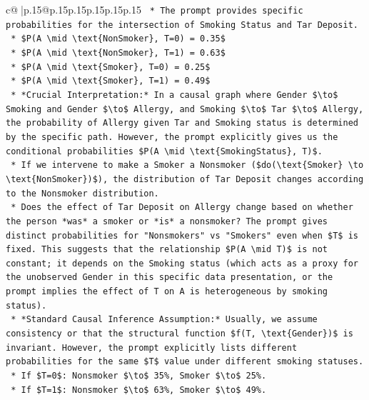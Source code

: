 \documentclass{article}
\begin{document}
{\begin{supertabular}{c@{$\;$}|p{.15\linewidth}@{}p{.15\linewidth}p{.15\linewidth}p{.15\linewidth}p{.15\linewidth}p{.15\linewidth}}
{{{\texttt{    *   The prompt provides specific probabilities for the intersection of Smoking Status and Tar Deposit.} \\
\texttt{        *   \$P(A \textbackslash{}mid \textbackslash{}text\{NonSmoker\}, T=0) = 0.35\$} \\
\texttt{        *   \$P(A \textbackslash{}mid \textbackslash{}text\{NonSmoker\}, T=1) = 0.63\$} \\
\texttt{        *   \$P(A \textbackslash{}mid \textbackslash{}text\{Smoker\}, T=0) = 0.25\$} \\
\texttt{        *   \$P(A \textbackslash{}mid \textbackslash{}text\{Smoker\}, T=1) = 0.49\$} \\
\texttt{    *   *Crucial Interpretation:* In a causal graph where Gender \$\textbackslash{}to\$ Smoking and Gender \$\textbackslash{}to\$ Allergy, and Smoking \$\textbackslash{}to\$ Tar \$\textbackslash{}to\$ Allergy, the probability of Allergy given Tar and Smoking status is determined by the specific path. However, the prompt explicitly gives us the conditional probabilities \$P(A \textbackslash{}mid \textbackslash{}text\{SmokingStatus\}, T)\$.} \\
\texttt{    *   If we intervene to make a Smoker a Nonsmoker (\$do(\textbackslash{}text\{Smoker\} \textbackslash{}to \textbackslash{}text\{NonSmoker\})\$), the distribution of Tar Deposit changes according to the Nonsmoker distribution.} \\
\texttt{    *   Does the effect of Tar Deposit on Allergy change based on whether the person *was* a smoker or *is* a nonsmoker? The prompt gives distinct probabilities for "Nonsmokers" vs "Smokers" even when \$T\$ is fixed. This suggests that the relationship \$P(A \textbackslash{}mid T)\$ is not constant; it depends on the Smoking status (which acts as a proxy for the unobserved Gender in this specific data presentation, or the prompt implies the effect of T on A is heterogeneous by smoking status).} \\
\texttt{    *   *Standard Causal Inference Assumption:* Usually, we assume consistency or that the structural function \$f(T, \textbackslash{}text\{Gender\})\$ is invariant. However, the prompt explicitly lists different probabilities for the same \$T\$ value under different smoking statuses.} \\
\texttt{        *   If \$T=0\$: Nonsmoker \$\textbackslash{}to\$ 35\%, Smoker \$\textbackslash{}to\$ 25\%.} \\
\texttt{        *   If \$T=1\$: Nonsmoker \$\textbackslash{}to\$ 63\%, Smoker \$\textbackslash{}to\$ 49\%.} \\
}}}
\end{supertabular}}
\end{document}
